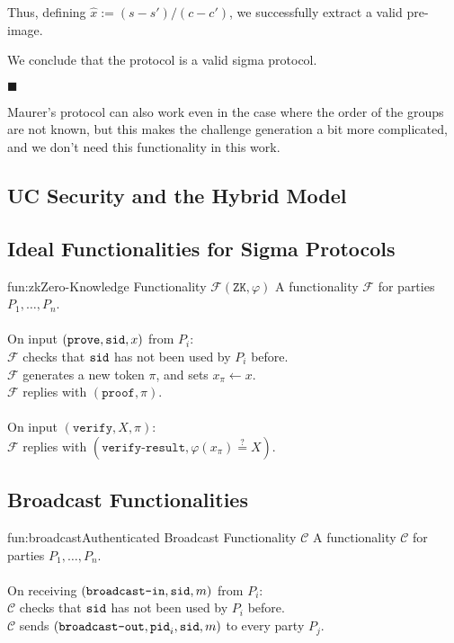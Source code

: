 Thus, defining $\hat{x} := (s - s') / (c - c')$, we successfully extract
a valid pre-image.

We conclude that the protocol is a valid sigma protocol.

$\blacksquare$

Maurer's protocol can also work even in the case where the order of
the groups are not known, but this makes the challenge generation
a bit more complicated, and we don't need this functionality in
this work.

\subsection{UC Security and the Hybrid Model}

\subsection{Ideal Functionalities for Sigma Protocols}

\begin{afunctionality}{fun:zk}{Zero-Knowledge Functionality $\mathcal{F}(\texttt{ZK}, \varphi)$}
A functionality $\mathcal{F}$ for parties $P_1, \ldots, P_n$.\\
\\
On input $(\texttt{prove}, \texttt{sid}, x)$ from $P_i$:\\
$\mathcal{F}$ checks that $\texttt{sid}$ has not been used by $P_i$ before.\\
$\mathcal{F}$ generates a new token $\pi$, and sets $x_\pi \gets x$.\\
$\mathcal{F}$ replies with $(\texttt{proof}, \pi)$.\\
\\
On input $(\texttt{verify}, X, \pi)$:\\
$\mathcal{F}$ replies with $(\texttt{verify-result}, \varphi(x_\pi) \stackrel{?}{=} X)$.\\


\end{afunctionality}

\subsection{Broadcast Functionalities}

\begin{afunctionality}{fun:broadcast}{Authenticated Broadcast Functionality $\mathcal{C}$}
A functionality $\mathcal{C}$ for parties $P_1, \ldots, P_n$.\\
\\
On receiving $(\texttt{broadcast-in}, \texttt{sid}, m)$ from $P_i$:\\
$\mathcal{C}$ checks that $\texttt{sid}$ has not been used by $P_i$ before.\\
$\mathcal{C}$ sends $(\texttt{broadcast-out}, \texttt{pid}_i, \texttt{sid}, m)$ to every party $P_j$.
\end{afunctionality}

